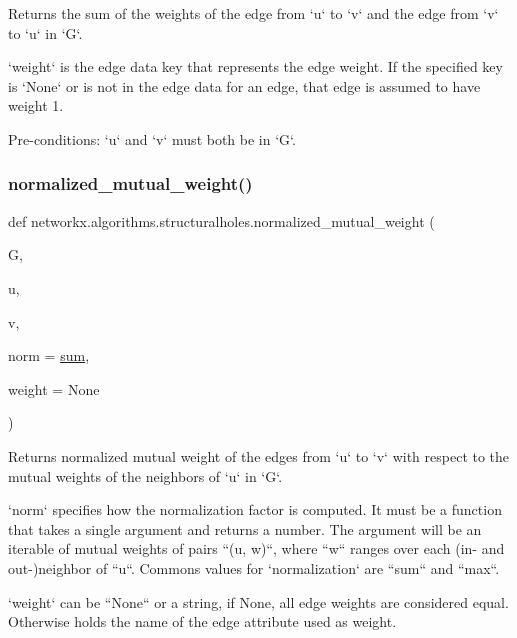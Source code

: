 \begin{DoxyVerb}Returns the sum of the weights of the edge from `u` to `v` and
the edge from `v` to `u` in `G`.

`weight` is the edge data key that represents the edge weight. If
the specified key is `None` or is not in the edge data for an edge,
that edge is assumed to have weight 1.

Pre-conditions: `u` and `v` must both be in `G`.\end{DoxyVerb}
 \mbox{\label{namespacenetworkx_1_1algorithms_1_1structuralholes_aad6692e85a58c9fb16f1be45606fa2b3}} 
\subsubsection{\texorpdfstring{normalized\+\_\+mutual\+\_\+weight()}{normalized\_mutual\_weight()}}
{\footnotesize\ttfamily def networkx.\+algorithms.\+structuralholes.\+normalized\+\_\+mutual\+\_\+weight (\begin{DoxyParamCaption}\item[{}]{G,  }\item[{}]{u,  }\item[{}]{v,  }\item[{}]{norm = {\ttfamily \hyperlink{assumed__shape_2foo__free_8f90_a1c860bb40bf43c289bc16f8634733f9a}{sum}},  }\item[{}]{weight = {\ttfamily None} }\end{DoxyParamCaption})}

\begin{DoxyVerb}Returns normalized mutual weight of the edges from `u` to `v`
with respect to the mutual weights of the neighbors of `u` in `G`.

`norm` specifies how the normalization factor is computed. It must
be a function that takes a single argument and returns a number.
The argument will be an iterable of mutual weights
of pairs ``(u, w)``, where ``w`` ranges over each (in- and
out-)neighbor of ``u``. Commons values for `normalization` are
``sum`` and ``max``.

`weight` can be ``None`` or a string, if None, all edge weights
are considered equal. Otherwise holds the name of the edge
attribute used as weight.\end{DoxyVerb}
 